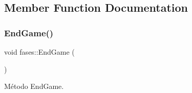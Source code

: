 \subsection{Member Function Documentation}
\mbox{\label{classfases_aa05ea0c25d2c70ee022f56f02003b4b5}} 
\subsubsection{\texorpdfstring{End\+Game()}{EndGame()}}
{\footnotesize\ttfamily void fases\+::\+End\+Game (\begin{DoxyParamCaption}{ }\end{DoxyParamCaption})}



Método End\+Game. 

